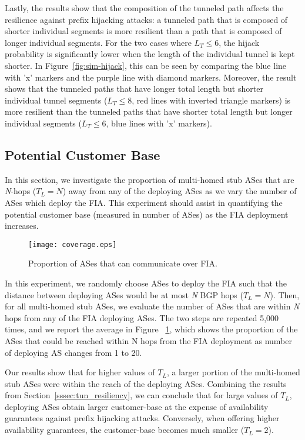 Lastly, the results show that the composition of the tunneled path affects the
resilience against prefix hijacking attacks: a tunneled path that is composed
of shorter individual segments is more resilient than a path that is composed
of longer individual segments. For the two cases where $L_T\leq6$, the hijack
probability is significantly lower when the length of the individual tunnel is
kept shorter. In Figure~\ref{fig:sim-hijack}, this can be seen by comparing the
blue line with 'x' markers and the purple line with diamond markers.  Moreover,
the result shows that the tunneled paths that have longer total length but
shorter individual tunnel segments (\ie $L_T\leq8$, red lines with inverted
triangle markers) is more resilient than the tunneled paths that have shorter
total length but longer individual segments (\ie $L_T\leq6$, blue lines with
'x' markers).

\subsection{Potential Customer Base}
\label{sssec:coverage}

In this section, we investigate the proportion of multi-homed stub ASes that
are \textit{N}-hops (\ie $T_L=N$) away from any of the deploying ASes as we
vary the number of ASes which deploy the FIA. This experiment should assist in
quantifying the potential customer base (measured in number of ASes) as the FIA
deployment increases.

\begin{figure}[h!]
	\center
	\texttt{[image: coverage.eps]}
	\caption{Proportion of ASes that can communicate over FIA.}
	\label{fig:sim-reach}                                                       
	 
\end{figure}

In this experiment, we randomly choose ASes to deploy the FIA such that the
distance between deploying ASes would be at most \textit{N} BGP hops
(\ie$T_L=N$).  Then, for all multi-homed stub ASes, we evaluate the number of
ASes that are within \textit{N} hops from any of the FIA deploying ASes. The
two steps are repeated 5,000 times, and we report the average in Figure
~\ref{fig:sim-reach}, which shows the proportion of the ASes that could be
reached within N hops from the FIA deployment as number of deploying AS changes
from 1 to 20.

Our results show that for higher values of $T_L$, a larger portion of the
multi-homed stub ASes were within the reach of the deploying ASes. Combining
the results from Section~\ref{sssec:tun_resiliency}, we can conclude that for
large values of $T_L$, deploying ASes obtain larger customer-base at the
expense of availability guarantees against prefix hijacking attacks.
Conversely, when offering higher availability guarantees, the customer-base
becomes much smaller (\ie $T_L=2$).

